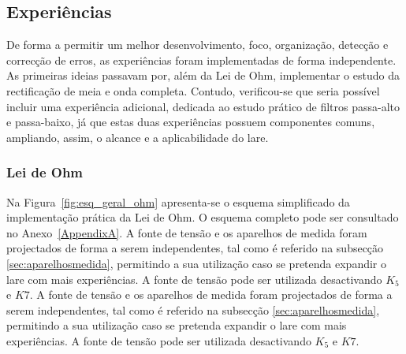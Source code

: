 \subsection{Experiências}
\label{sec:experiencias}
De forma a permitir um melhor desenvolvimento, foco, organização, detecção e correcção de erros, as experiências foram implementadas de forma independente. As primeiras ideias passavam por, além da Lei de Ohm, implementar o estudo da rectificação de meia e onda completa. Contudo, verificou-se que seria possível incluir uma experiência adicional, dedicada ao estudo prático de filtros passa-alto e passa-baixo, já que estas duas experiências possuem componentes comuns, ampliando, assim, o alcance e a aplicabilidade do \acrshort{lare}.

\subsubsection{Lei de Ohm}
\label{sec:lei_ohm}
Na Figura~\ref{fig:esq_geral_ohm} apresenta-se o esquema simplificado da implementação prática da Lei de Ohm. O esquema completo pode ser consultado no Anexo~\ref{AppendixA}. A fonte de tensão e os aparelhos de medida foram projectados de forma a serem independentes, tal como é referido na subsecção \ref{sec:aparelhosmedida}, permitindo a sua utilização caso se pretenda expandir o \acrshort{lare} com mais experiências. A fonte de tensão pode ser utilizada desactivando $K_{5}$ e $K7$.
A fonte de tensão e os aparelhos de medida foram projectados de forma a serem independentes, tal como é referido na subsecção \ref{sec:aparelhosmedida}, permitindo a sua utilização caso se pretenda expandir o \acrshort{lare} com mais experiências. A fonte de tensão pode ser utilizada desactivando $K_{5}$ e $K7$. 

